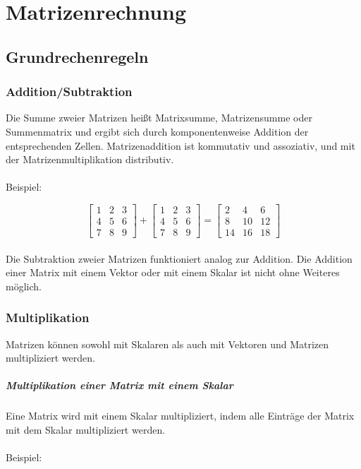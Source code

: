 \documentclass[11pt]{scrreprt}
\begin{document}
\tableofcontents
\chapter{Matrizenrechnung}

\section{Grundrechenregeln}

\subsection{Addition/Subtraktion}
\label{sec:Addition/Subtraktion}
Die Summe zweier Matrizen heißt Matrixsumme, Matrizensumme oder Summenmatrix und ergibt sich durch komponentenweise Addition der entsprechenden Zellen.
Matrizenaddition ist kommutativ und assoziativ, und mit der Matrizenmultiplikation distributiv. \\
\\
Beispiel:

\begin{equation}
\begin{bmatrix}
1 & 2 & 3 \\
4 & 5 & 6 \\
7 & 8 & 9
\end {bmatrix}
+
\begin{bmatrix}
1 & 2 & 3 \\
4 & 5 & 6 \\
7 & 8 & 9
\end {bmatrix}
=
\begin{bmatrix}
2 & 4 & 6 \\
8 & 10 & 12 \\
14 & 16 & 18
\end {bmatrix}
\end{equation}
\\
Die Subtraktion zweier Matrizen funktioniert analog zur Addition. Die Addition einer Matrix mit einem Vektor oder mit einem Skalar ist nicht ohne Weiteres möglich.

\subsection{Multiplikation}
Matrizen können sowohl mit Skalaren als auch mit Vektoren und Matrizen multipliziert werden.
\paragraph{Multiplikation einer Matrix mit einem Skalar}
Eine Matrix wird mit einem Skalar multipliziert, indem alle Einträge der Matrix mit dem Skalar multipliziert werden.\\
\\
Beispiel:
\end{document}

